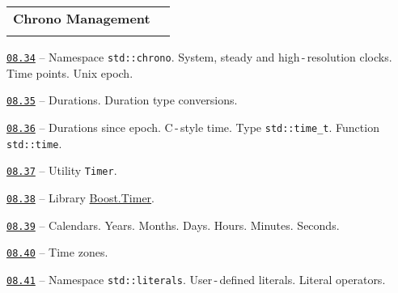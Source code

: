 \documentclass[a4paper,12pt]{article}
\renewenvironment{itemize}
{
    \begin{list}{\labelitemi}
    {
      \setlength{\topsep}{0pt}
      \setlength{\partopsep}{0pt}
      \setlength{\parskip}{0pt}
      \setlength{\itemsep}{0pt}
      \setlength{\parsep}{0pt}
      \setlength{\leftmargin}{14.5pt}
    }
}{\end{list}}
\begin{document}
\bigskip\medskip

\begin{tabular}{!{\vrule width 1pt}L{4.2cm}!{\vrule width 1pt}L{14.8cm}!{\vrule width 0pt}} 


\textbf{Chrono Management} & \\


\end{tabular}

\medskip\smallskip

\begin{itemize}

    \item \href{https://github.com/i-s-m-mipt/Education/blob/master/projects/examples/source/08.34.cpp}{\texttt{08.34}} -- Namespace \lstinline{std::chrono}. System, steady and high\,-\,resolution clocks. Time points. Unix epoch.

    \smallskip

    \item \href{https://github.com/i-s-m-mipt/Education/blob/master/projects/examples/source/08.35.cpp}{\texttt{08.35}} -- Durations. Duration type conversions.

    \smallskip

    \item \href{https://github.com/i-s-m-mipt/Education/blob/master/projects/examples/source/08.36.cpp}{\texttt{08.36}} -- Durations since epoch. C\,-\,style time. Type \lstinline{std::time_t}. Function \lstinline{std::time}.

    \smallskip

    \item \href{https://github.com/i-s-m-mipt/Education/blob/master/projects/examples/source/08.37.cpp}{\texttt{08.37}} -- Utility \lstinline{Timer}.

    \smallskip

    \item \href{https://github.com/i-s-m-mipt/Education/blob/master/projects/examples/source/08.38.cpp}{\texttt{08.38}} -- Library \href{https://www.boost.org/doc/libs/1_85_0/libs/timer/doc/index.html}{Boost.Timer}.

    \smallskip

    \item \href{https://github.com/i-s-m-mipt/Education/blob/master/projects/examples/source/08.39.cpp}{\texttt{08.39}} -- Calendars. Years. Months. Days. Hours. Minutes. Seconds.

    \smallskip

    \item \href{https://github.com/i-s-m-mipt/Education/blob/master/projects/examples/source/08.40.cpp}{\texttt{08.40}} -- Time zones.

    \smallskip

    \item \href{https://github.com/i-s-m-mipt/Education/blob/master/projects/examples/source/08.41.cpp}{\texttt{08.41}} -- Namespace \lstinline{std::literals}. User\,-\,defined literals. Literal operators.

\end{itemize}
\end{document}
